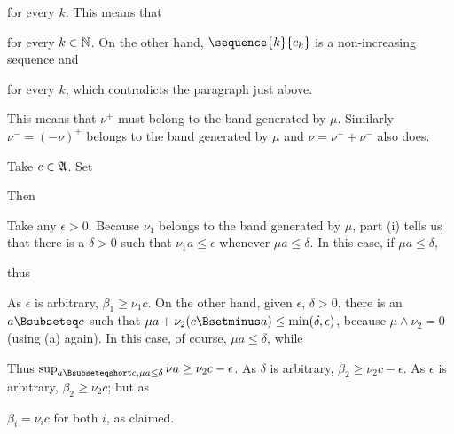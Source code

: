 {

\noindent for every $k$.   This means that


\noindent for every $k\in\Bbb N$.   On the other hand,
$\sequence{k}{c_k}$ is a non-increasing sequence and


\noindent for every $k$, which contradicts the paragraph just
above.\ \Bang

This means that $\nu^+$ must belong to the band generated by $\mu$.
Similarly $\nu^-=(-\nu)^+$ belongs to the band generated by $\mu$ and
$\nu=\nu^++\nu^-$ also does.

\medskip

 Take $c\in\frak A$.   Set


\noindent Then


\noindent Take any $\epsilon>0$.   Because $\nu_1$ belongs to the band
generated by $\mu$, part (i) tells us that there is a $\delta>0$ such
that $\nu_1 a\le\epsilon$ whenever $\mu a\le\delta$.   In this case, if
$\mu a\le\delta$,


\noindent thus


\noindent As $\epsilon$ is arbitrary, $\beta_1\ge\nu_1c$.   On the other
hand, given $\epsilon$, $\delta>0$, there is an $a\Bsubseteq c$ such
that $\mu a+\nu_2(c\Bsetminus a)\le\min(\delta,\epsilon)$, because
$\mu\wedge\nu_2=0$ (using (a) again).   In this case, of course, $\mu
a\le\delta$, while


\noindent Thus $\sup_{a\Bsubseteqshort c,\mu a\le\delta}\nu a
\ge\nu_2c-\epsilon$.   As $\delta$ is arbitrary,
$\beta_2\ge\nu_2c-\epsilon$.   As $\epsilon$ is arbitrary,
$\beta_2\ge\nu_2c$;  but as


\noindent $\beta_i=\nu_ic$ for both $i$, as claimed.
}%

